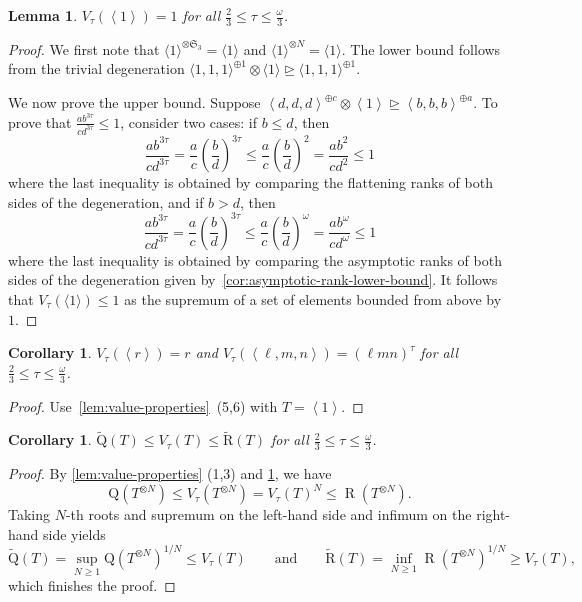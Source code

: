 \documentclass[11pt,letterpaper]{article}
\newtheorem{corollary}[theorem]{Corollary}\AddToHook{env/corollary/begin}{\crefalias{theorem}{corollary}}
\newtheorem{lemma}[theorem]{Lemma}\AddToHook{env/lemma/begin}{\crefalias{theorem}{lemma}}
\numberwithin{equation}{section}
\newcommand{\ark}{\widetilde{\mathrm{R}}}
\DeclareMathOperator{\Rk}{\mathrm{R}}
\begin{document}
\begin{lemma}\label{lem:value-unit}
  $V_\tau(\left<1\right>) = 1$ for all $\frac23\leq\tau\leq \frac{\omega}{3}$.
\end{lemma}
\begin{proof}
We first note that $\langle 1\rangle^{\otimes\mathfrak{S}_3}=\langle 1\rangle$ and $\langle 1\rangle^{\otimes N}=\langle 1\rangle$.
The lower bound follows from the trivial degeneration $\langle 1,1,1\rangle^{\oplus 1}\otimes\langle 1\rangle \trianglerighteq\langle 1,1,1\rangle^{\oplus 1}$.

We now prove the upper bound.
Suppose $\left<d,d,d\right>^{\oplus c} \otimes \left<1\right> \trianglerighteq \left<b,b,b\right>^{\oplus a}$. To prove that $\frac{ab^{3\tau}}{cd^{3\tau}} \leq 1$, consider two cases:
if $b\leq d$, then \[
\frac{ab^{3\tau}}{cd^{3\tau}} = \frac{a}{c}\left(\frac{b}{d}\right)^{3\tau} \leq \frac{a}{c}\left(\frac{b}{d}\right)^{2} = \frac{ab^2}{cd^2}  \leq 1
\] where the last inequality is obtained by comparing the flattening ranks of both sides of the degeneration,
and if $b> d$, then \[
\frac{ab^{3\tau}}{cd^{3\tau}} = \frac{a}{c}\left(\frac{b}{d}\right)^{3\tau} \leq \frac{a}{c}\left(\frac{b}{d}\right)^{\omega} =\frac{ab^{\omega}}{cd^{\omega}}  \leq 1
\] where the last inequality is obtained by comparing the asymptotic ranks of both sides of the degeneration given by~\cref{cor:asymptotic-rank-lower-bound}.
It follows that $V_\tau(\langle 1\rangle)\leq 1$ as the supremum of a set of elements bounded from above by $1$.
\end{proof}

\begin{corollary}\label{cor:value-diag-matrix}
  $V_\tau(\left<r\right>) = r$ and $V_\tau(\left<\ell,m,n\right>) = (\ell mn)^\tau$ for all $\frac23\leq \tau\leq  \frac{\omega}{3}$.
\end{corollary}
\begin{proof}
  Use~\cref{lem:value-properties}~(5,6) with $T = \left<1\right>$.
\end{proof}

\begin{corollary}\label{lem:rank-value}
  $\widetilde{\mathrm{Q}}(T) \leq V_\tau(T) \leq \ark(T)$ for all $\frac23\leq \tau\leq  \frac{\omega}{3}$.
\end{corollary}
\begin{proof}
By \cref{lem:value-properties} (1,3) and \cref{cor:value-diag-matrix}, we have \[
\mathrm{Q}(T^{\otimes N}) \leq V_\tau(T^{\otimes N}) = V_\tau(T)^N \leq \Rk(T^{\otimes N}).
\]
Taking $N$-th roots and supremum on the left-hand side and infimum on the right-hand side yields
\[
\widetilde{\mathrm{Q}}(T) = \sup_{N\geq 1} \mathrm{Q}(T^{\otimes N})^{1/N} \leq V_\tau(T) \qquad \text{and}\qquad \ark(T) = \inf_{N\geq 1} \Rk(T^{\otimes N})^{1/N}\geq V_\tau(T),
\] which finishes the proof.
\end{proof}
\end{document}
